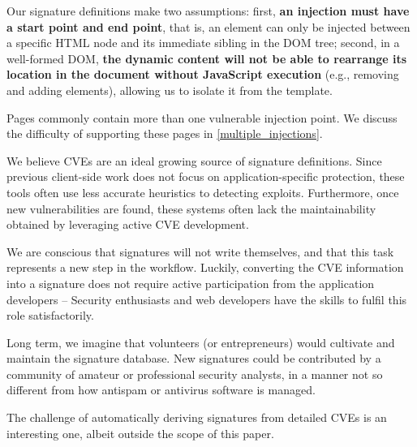 Our signature definitions make two assumptions: first,
\textbf{an injection must have a start point and end point}, that is,
an element can only be injected between a specific HTML node and its
immediate sibling in the DOM tree; second, in a well-formed DOM,
\textbf{the dynamic content will not be able to rearrange its location
  in the document without JavaScript execution} (e.g., removing and
adding elements), allowing us to isolate it from the template.

Pages commonly contain more than one vulnerable injection point.
We discuss the difficulty of supporting these pages in \autoref{multiple_injections}.

We believe CVEs are an ideal growing source of signature
definitions. Since previous client-side work does not focus on
application-specific protection, these tools often use less accurate
heuristics to detecting exploits. Furthermore, once new
vulnerabilities are found, these systems often lack the
maintainability obtained by leveraging active CVE development.

We are conscious that \sys signatures will not write themselves, and that
this task represents a new step in the workflow. Luckily, converting
the CVE information into a signature does not require active
participation from the application developers -- Security enthusiasts and
web developers have the skills to fulfil this role satisfactorily.

Long term, we imagine that volunteers (or entrepreneurs) would
cultivate and maintain the signature database. New signatures could be
contributed by a community of amateur or professional security analysts, in a manner not
so different from how antispam or antivirus software is managed.

The challenge of automatically deriving signatures from detailed CVEs is an interesting
one, albeit outside the scope of this paper.


